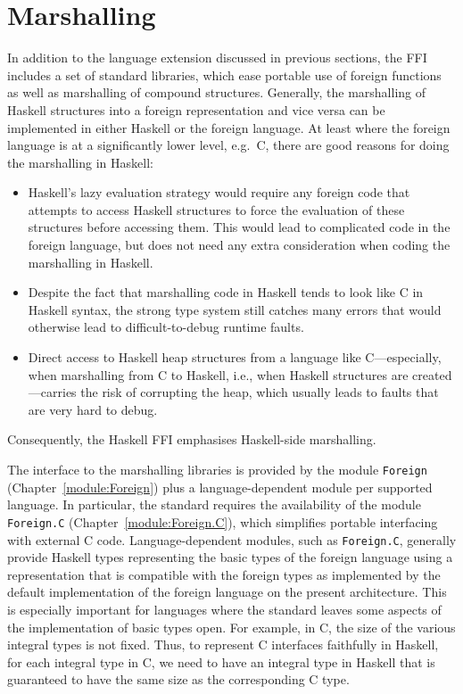 \section{Marshalling}
\label{sec:marshalling}

In addition to the language extension discussed in previous sections, the FFI
includes a set of standard libraries, which ease portable use of foreign
functions as well as marshalling of compound structures.  Generally, the
marshalling of Haskell structures into a foreign representation and vice versa
can be implemented in either Haskell or the foreign language.  At least where
the foreign language is at a significantly lower level, e.g.\ C, there are
good reasons for doing the marshalling in Haskell:
%
\begin{itemize}
\item Haskell's lazy evaluation strategy would require any foreign code that
  attempts to access Haskell structures to force the evaluation of these
  structures before accessing them. This would lead to complicated code in the
  foreign language, but does not need any extra consideration when coding the
  marshalling in Haskell.
\item Despite the fact that marshalling code in Haskell tends to look like C
  in Haskell syntax, the strong type system still catches many errors that
  would otherwise lead to difficult-to-debug runtime faults.
\item Direct access to Haskell heap structures from a language like
  C---especially, when marshalling from C to Haskell, i.e., when Haskell
  structures are created---carries the risk of corrupting the heap, which
  usually leads to faults that are very hard to debug.
\end{itemize}
%
Consequently, the Haskell FFI emphasises Haskell-side marshalling.

The interface to the marshalling libraries is provided by the module
\mbox{\tt Foreign} (Chapter~\ref{module:Foreign}) plus a language-dependent module per supported language.  In
particular, the standard requires the availability of the module
\mbox{\tt Foreign.C} (Chapter~\ref{module:Foreign.C}), which simplifies portable interfacing with external C code.
Language-dependent modules, such as \mbox{\tt Foreign.C}, generally provide Haskell
types representing the basic types of the foreign language using a
representation that is compatible with the foreign types as implemented by the
default implementation of the foreign language on the present architecture.
This is especially important for languages where the standard leaves some
aspects of the implementation of basic types open.  For example, in C, the
size of the various integral types is not fixed.  Thus, to represent C
interfaces faithfully in Haskell, for each integral type in C, we need to have
an integral type in Haskell that is guaranteed to have the same size as the
corresponding C type.

